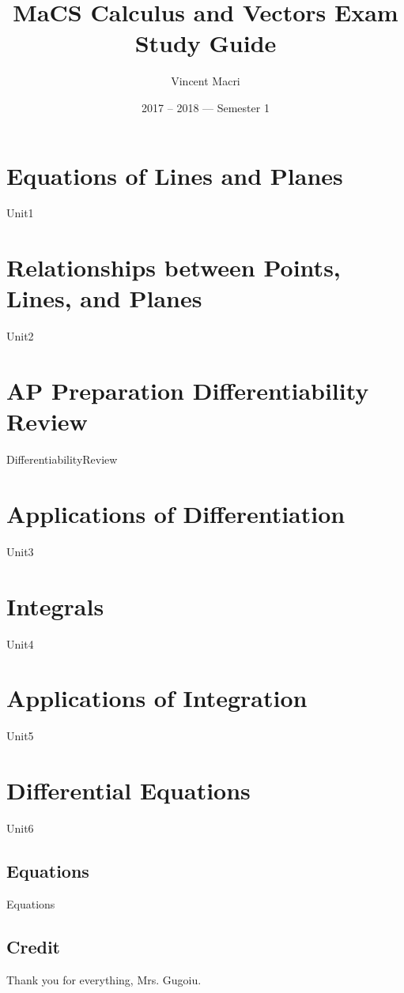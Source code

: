 \documentclass[letterpaper,12pt]{report}
\title{MaCS Calculus and Vectors Exam Study Guide}
\author{Vincent Macri}
\date{2017 -- 2018 --- Semester 1}
\begin{document}
	\maketitle
	\clearpage
	\tableofcontents
	\clearpage

	\part{Equations of Lines and Planes}
		{Unit1}
	\part{Relationships between Points, Lines, and Planes}
		{Unit2}
	\part*{AP Preparation Differentiability Review}
		{DifferentiabilityReview}
	\part{Applications of Differentiation}
		{Unit3}
	\part{Integrals}
		{Unit4}
	\part{Applications of Integration}
		{Unit5}
	\part{Differential Equations}
		{Unit6}
	
	\appendix
	\chapter{Equations}
		{Equations}
	\chapter{Credit}
		Thank you for everything, Mrs. Gugoiu.
\end{document}
